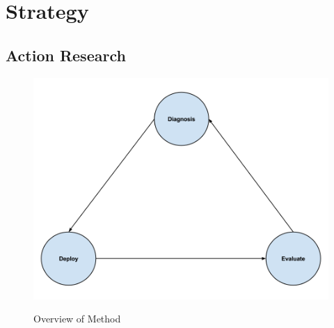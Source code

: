 \section{Strategy}
\subsection{Action Research}
\begin{figure}
\includegraphics[width=13cm, natwidth=960, natheight=770]{empirical/method/images/overOrdnetActionMethod.png}
\centering
\label{ooam}
\caption{Overview of Method}
\end{figure}